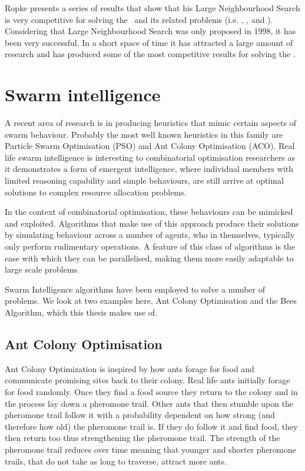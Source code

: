 Ropke presents a series of results that show that his Large Neighbourhood Search is very competitive for solving the \VRP\ and its related problems (i.e. \VRPTW, \PDPTW, and \DARP). Considering that Large Neighbourhood Search was only proposed in 1998, it has been very successful. In a short space of time it has attracted a large amount of research and has produced some of the most competitive results for solving the \VRP.

\section{Swarm intelligence}
\label{sec:si}

A recent area of research is in producing heuristics that mimic certain aspects of swarm behaviour. Probably the most well known heuristics in this family are Particle Swarm Optimisation (PSO) and Ant Colony Optimisation (ACO). Real life swarm intelligence is interesting to combinatorial optimisation researchers as it demonstrates a form of emergent intelligence, where individual members with limited reasoning capability and simple behaviours, are still arrive at optimal solutions to complex resource allocation problems.

In the context of combinatorial optimisation, these behaviours can be mimicked and exploited. Algorithms that make use of this approach produce their solutions by simulating behaviour across a number of agents, who in themselves, typically only perform rudimentary operations. A feature of this class of algorithms is the ease with which they can be parallelised, making them more easily adaptable to large scale problems.

Swarm Intelligence algorithms have been employed to solve a number of problems. We look at two examples here, Ant Colony Optimisation and the Bees Algorithm, which this thesis makes use of.

\subsection{Ant Colony Optimisation}

Ant Colony Optimization is inspired by how ants forage for food and communicate promising sites back to their colony. Real life ants initially forage for food randomly. Once they find a food source they return to the colony and in the process lay down a pheromone trail. Other ants that then stumble upon the pheromone trail follow it with a probability dependent on how strong (and therefore how old) the pheromone trail is. If they do follow it and find food, they then return too thus strengthening the pheromone trail. The strength of the pheromone trail reduces over time meaning that younger and shorter pheromone trails, that do not take as long to traverse, attract more ants.  

